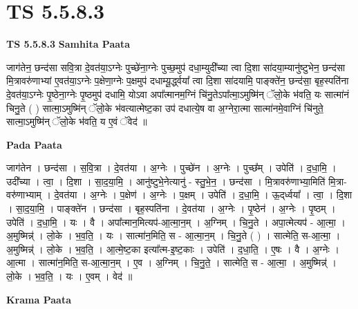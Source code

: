\documentclass[17pt]{extarticle}
\begin{document}
\section{ TS 5.5.8.3 }

\textbf{TS 5.5.8.3 } \newline
\textbf{Samhita Paata} \newline

जाग॑तेन॒ छन्द॑सा सवि॒त्रा दे॒वत॑या॒ऽग्नेः पुच्छे॑ना॒ग्नेः पुच्छ॒मुप॑ दधा॒म्युदी᳚च्या त्वा दि॒शा सा॑दया॒म्यानु॑ष्टुभेन॒ छन्द॑सा मि॒त्रावरु॑णाभ्यां ए॒वत॑या॒ऽग्नेः प॒क्षेणा॒ग्नेः प॒क्षमुप॑ दधाम्यू॒र्द्ध्वया᳚ त्वा दि॒शा सा॑दयामि॒ पाङ्क्ते॑न॒ छन्द॑सा॒ बृह॒स्पति॑ना दे॒वत॑या॒ऽग्नेः पृ॒ष्ठेना॒ग्नेः पृ॒ष्ठमुप॑ दधामि॒ योऽवा अपा᳚त्मानम॒ग्निं चि॑नु॒तेऽपा᳚त्मा॒ऽमुष्मि॑न् ॅलो॒के भ॑वति॒ यः सात्मा॑नं चिनु॒ते ( ) सात्मा॒ऽमुष्मि॑न् ॅलो॒के भ॑वत्यात्मेष्ट॒का उप॑ दधात्ये॒ष वा अ॒ग्नेरा॒त्मा सात्मा॑नमे॒वाग्निं चि॑नुते॒ सात्मा॒ऽमुष्मि॑न् ॅलो॒के भ॑वति॒ य ए॒वं ॅवेद॑ ॥ \newline

\textbf{Pada Paata} \newline

जाग॑तेन । छन्द॑सा । स॒वि॒त्रा । दे॒वत॑या । अ॒ग्नेः । पुच्छे॑न । अ॒ग्नेः । पुच्छ᳚म् । उपेति॑ । द॒धा॒मि॒ । उदी᳚च्या । त्वा॒ । दि॒शा । सा॒द॒या॒मि॒ । आनु॑ष्टुभे॒नेत्यानु॑ - स्तु॒भे॒न॒ । छन्द॑सा । मि॒त्रावरु॑णाभ्या॒मिति॑ मि॒त्रा-वरु॑णाभ्याम् । दे॒वत॑या । अ॒ग्नेः । प॒क्षेण॑ । अ॒ग्नेः । प॒क्षम् । उपेति॑ । द॒धा॒मि॒ । ऊ॒द्‌र्ध्वया᳚ । त्वा॒ । दि॒शा । सा॒द॒या॒मि॒ । पाङ्क्ते॑न । छन्द॑सा । बृह॒स्पति॑ना । दे॒वत॑या । अ॒ग्नेः । पृ॒ष्ठेन॑ । अ॒ग्नेः । पृ॒ष्ठम् । उपेति॑ । द॒धा॒मि॒ । यः । वै । अपा᳚त्मान॒मित्यप॑-आ॒त्मा॒न॒म् । अ॒ग्निम् । चि॒नु॒ते । अपा॒त्मेत्यप॑ - आ॒त्मा॒ । अ॒मुष्मिन्न्॑ । लो॒के । भ॒व॒ति॒ । यः । सात्मा॑न॒मिति॒ स - आ॒त्मा॒न॒म् । चि॒नु॒ते ( ) । सात्मेति॒ स-आ॒त्मा॒ । अ॒मुष्मिन्न्॑ । लो॒के । भ॒व॒ति॒ । आ॒त्मे॒ष्ट॒का इत्या᳚त्म-इ॒ष्ट॒काः । उपेति॑ । द॒धा॒ति॒ । ए॒षः । वै । अ॒ग्नेः । आ॒त्मा । सात्मा॑न॒मिति॒ स-आ॒त्मा॒न॒म् । ए॒व । अ॒ग्निम् । चि॒नु॒ते॒ । सात्मेति॒ स - आ॒त्मा॒ । अ॒मुष्मिन्न्॑ । लो॒के । भ॒व॒ति॒ । यः । ए॒वम् । वेद॑ ॥  \newline


\textbf{Krama Paata} \newline
\end{document}
